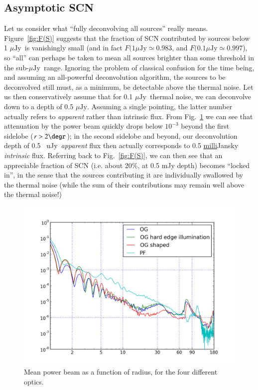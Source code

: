 \documentclass{aa}
\newcommand{\uJy}{$\mu\mathrm{Jy}$}
\begin{document}
\subsection{Asymptotic SCN}
\label{sec:asymptotic-fscn}

Let us consider what ``fully deconvolving all sources'' really means. Figure~\ref{fig:F(S)} suggests that the fraction of SCN contributed by sources below 1 \uJy\ is vanishingly small (and in fact $F(1\mu\mathrm{Jy}\simeq0.983$, and $F(0.1\mu\mathrm{Jy}\simeq0.997$), so ``all'' can perhaps be taken to mean all sources brighter than some threshold in the sub-\uJy\ range. Ignoring the problem of classical confusion for the time being, and assuming an all-powerful deconvolution algorithm, the sources to be deconvolved still must, as a minimum, be detectable above the thermal noise. Let us then conservatively assume that for 0.1 \uJy\ thermal noise, we can deconvolve down to a depth of 0.5 \uJy. Assuming a single pointing, the latter number actually refers to {\em apparent} rather than intrinsic flux. From Fig.~\ref{fig:power-beam} we can see that attenuation by the power beam quickly drops below $10^{-3}$ beyond the first sidelobe ($r>2\degr$); in the second sidelobe and beyond, our deconvolution depth of 0.5 \
uJy\ {\em apparent} flux 
then actually corresponds to 0.5 \underline{milli}Jansky {\em intrinsic} flux. Referring back to Fig.~\ref{fig:F(S)}, we can then see that an appreciable fraction of SCN (i.e. about 20\%, at 0.5 mJy depth) becomes ``locked in'', in the sense that the sources contributing it are individually swallowed by the thermal noise (while the sum of their contributions may remain well above the thermal noise!)

\begin{figure}
\includegraphics[width=\columnwidth]{power-beam-radial}
\caption{\label{fig:power-beam}Mean power beam as a function of radius, for the four different optics.}
\end{figure}
\end{document}
